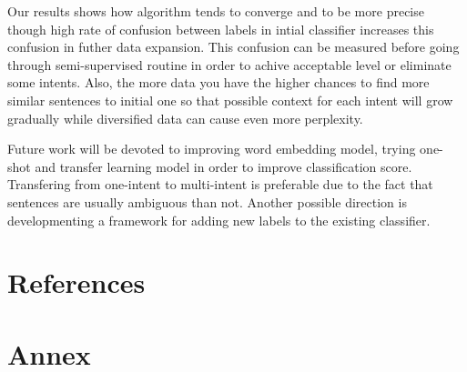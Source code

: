 \documentclass[11pt]{article}
\begin{document}
Our results shows how algorithm tends to converge and to be more precise though high rate of confusion between labels in intial classifier increases this confusion in futher data expansion. This confusion can be measured before going through semi-supervised routine in order to achive acceptable level or eliminate some intents. Also, the more data you have the higher chances to find more similar sentences to initial one so that possible context for each intent will grow gradually while diversified data can cause even more perplexity.

Future work will be devoted to improving word embedding model, trying one-shot and transfer learning model in order to improve classification score. Transfering from one-intent to multi-intent is preferable due to the fact that sentences are usually ambiguous than not. Another possible direction is developmenting a framework for adding new labels to the existing classifier.

\section{References}





\section{Annex}
\end{document}
